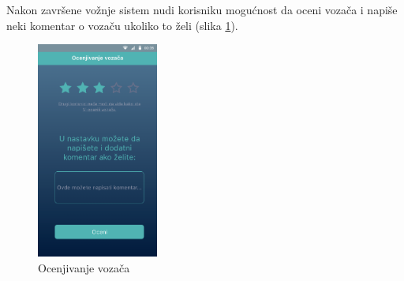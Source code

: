 Nakon završene vožnje sistem nudi korisniku mogućnost da oceni vozača i napiše neki komentar o vozaču ukoliko to želi (slika \ref{fig:Ocenjivanje vozaca}).

\begin{figure}[h!]
\begin{center}
\includegraphics[width=4cm]{Slike/ocenjivanje_vozaca.png}
\end{center}
    \caption{Ocenjivanje vozača}
\label{fig:Ocenjivanje vozaca}
\end{figure}













